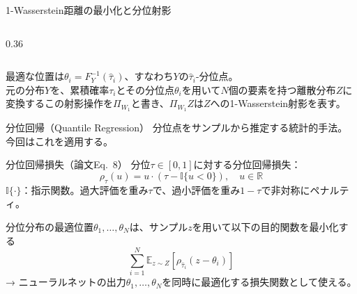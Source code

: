 \documentclass[aspectratio=169, dvipdfmx, 11pt]{beamer}
\begin{document}
\begin{frame}{1-Wasserstein距離の最小化と分位射影}
\begin{columns}[T]
\begin{column}{0.36\textwidth}
\begin{center}
      \end{center}
    \end{column}
  \end{columns}
  \vspace{-1.0em}
  {\footnotesize
  最適な位置は$\theta_i = F_Y^{-1}(\hat{\tau}_i)$、すなわち$Y$の$\hat{\tau}_i$-分位点。\\
  元の分布$Y$を、累積確率$\tau_i$とその分位点$\theta_i$を用いて$N$個の要素を持つ離散分布$Z$に変換するこの射影操作を$\Pi_{W_1}$と書き、$\Pi_{W_1}Z$は$Z$への1-Wasserstein射影を表す。
  }
\end{frame}

\begin{frame}{分位回帰（Quantile Regression）}
  {\small 分位点をサンプルから推定する統計的手法。今回はこれを適用する。}
  \begin{block}{分位回帰損失（論文Eq.~8）}
    {\small 分位$\tau \in [0,1]$に対する分位回帰損失：}
    {\small
    \vspace{-6pt}
    \[
      \rho_\tau(u) = u \cdot (\tau - \mathbb{I}\{u < 0\}), \quad u \in \mathbb{R}
    \]
    \vspace{-8pt}
    }
    {\scriptsize $\mathbb{I}\{\cdot\}$：指示関数。過大評価を重み$\tau$で、過小評価を重み$1-\tau$で非対称にペナルティ。}
  \end{block}
  {\small 分位分布の最適位置$\theta_1, \dots, \theta_N$は、サンプル$z$を用いて以下の目的関数を最小化する}
  {\small
  \vspace{-6pt}
  \[
    \sum_{i=1}^{N} \mathbb{E}_{z \sim Z}\!\left[\rho_{\hat{\tau}_i}(z - \theta_i)\right]
  \]
  \vspace{-8pt}
  }
  {\scriptsize → ニューラルネットの出力$\theta_1, \dots, \theta_N$を同時に最適化する損失関数として使える。}
\end{frame}
\end{document}
